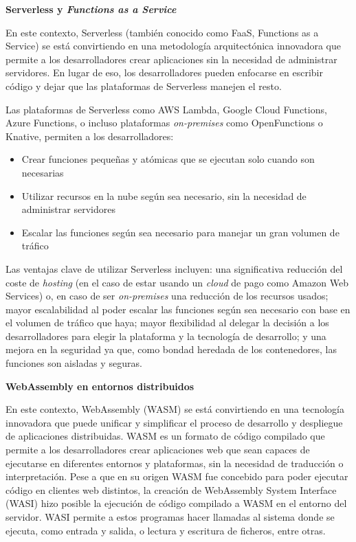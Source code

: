 \textbf{Serverless y \textit{Functions as a Service}}

En este contexto, Serverless (también conocido como FaaS, Functions as a Service) se está convirtiendo en una metodología arquitectónica innovadora que permite a los desarrolladores crear aplicaciones sin la necesidad de administrar servidores. En lugar de eso, los desarrolladores pueden enfocarse en escribir código y dejar que las plataformas de Serverless manejen el resto.

Las plataformas de Serverless como AWS Lambda, Google Cloud Functions, Azure Functions, o incluso plataformas \textit{on-premises} como OpenFunctions o Knative, permiten a los desarrolladores:

\begin{itemize}
    \item Crear funciones pequeñas y atómicas que se ejecutan solo cuando son necesarias
    \item Utilizar recursos en la nube según sea necesario, sin la necesidad de administrar servidores
    \item Escalar las funciones según sea necesario para manejar un gran volumen de tráfico
\end{itemize}

Las ventajas clave de utilizar Serverless incluyen: una significativa reducción del coste de \textit{hosting} (en el caso de estar usando un \textit{cloud} de pago como Amazon Web Services) o, en caso de ser \textit{on-premises} una reducción de los recursos usados; mayor escalabilidad al poder escalar las funciones según sea necesario con base en el volumen de tráfico que haya; mayor flexibilidad al delegar la decisión a los desarrolladores para elegir la plataforma y la tecnología de desarrollo; y una mejora en la seguridad ya que, como bondad heredada de los contenedores, las funciones son aisladas y seguras.


\textbf{WebAssembly en entornos distribuidos}

En este contexto, WebAssembly (WASM) se está convirtiendo en una tecnología innovadora que puede unificar y simplificar el proceso de desarrollo y despliegue de aplicaciones distribuidas. WASM es un formato de código compilado que permite a los desarrolladores crear aplicaciones web que sean capaces de ejecutarse en diferentes entornos y plataformas, sin la necesidad de traducción o interpretación. Pese a que en su origen WASM fue concebido para poder ejecutar código en clientes web distintos, la creación de WebAssembly System Interface (WASI) hizo posible la ejecución de código compilado a WASM en el entorno del servidor. WASI permite a estos programas hacer llamadas al sistema donde se ejecuta, como entrada y salida, o lectura y escritura de ficheros, entre otras.

